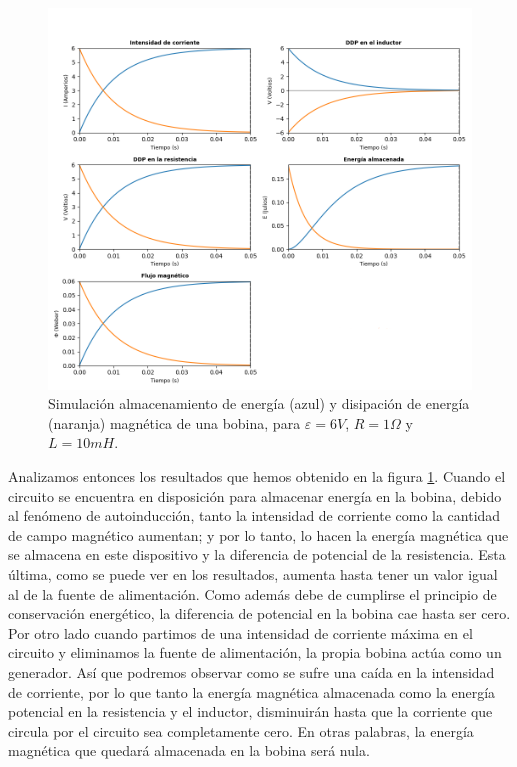 \documentclass[../main.tex]{subfiles}
\begin{document}
\begin{figure}[!h]
    \centering
    \includegraphics[width=\textwidth]{images/resultados_ejemplo_circuitoRL.png}
    \caption{Simulación almacenamiento de energía (azul) y disipación de energía (naranja) magnética de una bobina, para $\varepsilon=6V$, $R=1 \Omega$ y $L=10 mH$.}
    \label{fig::sim_ejemplo_rl}
\end{figure}


Analizamos entonces los resultados que hemos obtenido en la figura \ref{fig::sim_ejemplo_rl}. Cuando el circuito se encuentra en disposición para almacenar energía en la bobina, debido al fenómeno de autoinducción, tanto la intensidad de corriente como la cantidad de campo magnético aumentan; y por lo tanto, lo hacen la energía magnética que se almacena en este dispositivo y la diferencia de potencial de la resistencia. Esta última, como se puede ver en los resultados, aumenta hasta tener un valor igual al de la fuente de alimentación. Como además debe de cumplirse el principio de conservación energético, la diferencia de potencial en la bobina cae hasta ser cero.\\ 

Por otro lado cuando partimos de una intensidad de corriente máxima en el circuito y eliminamos la fuente de alimentación, la propia bobina actúa como un generador. Así que podremos observar como se sufre una caída en la intensidad de corriente, por lo que tanto la energía magnética almacenada como la energía potencial en la resistencia y el inductor, disminuirán hasta que la corriente que circula por el circuito sea completamente cero. En otras palabras, la energía magnética que quedará almacenada en la bobina será nula.
\end{document}
